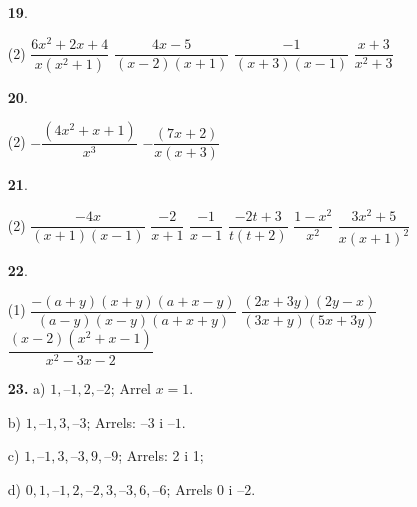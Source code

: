 \documentclass[a4paper, pdf, twoside]{book}
\begin{document}
\begin{multicols}{2}
\begin{enumerate}

 \item[\fontfamily{phv}\selectfont\color{blue}\textbf{19}. ] 
 \begin{tasks}[column-sep=1em, item-indent=1.3333em](2)
	 \task $\dfrac {6x^2+2x+4}{x(x^2+1)}$
	 \task $\dfrac {4x-5}{(x-2)(x+1)}$
	 \task $\dfrac {-1}{(x+3)(x-1)}$
	 \task $\dfrac {x+3}{x^2+3}$
\end{tasks}
 \end{enumerate}
\begin{enumerate}
\vspace{0.25cm}



 \item[\fontfamily{phv}\selectfont\color{blue}\textbf{20}. ] 
 \begin{tasks}[column-sep=1em, item-indent=1.3333em](2)
	 \task $-\dfrac {(4x^2+x+1)}{x^3}$
	 \task $-\dfrac {(7x+2)}{x(x+3)}$
\end{tasks}
\vspace{0.25cm}



 \item[\fontfamily{phv}\selectfont\color{blue}\textbf{21}. ]  \scalebox{0.6}{\simbolclau } 
 \begin{tasks}[column-sep=1em, item-indent=1.3333em](2)
	 \task  $\dfrac {-4x}{(x+1)(x-1)} $
	 \task $\dfrac {-2}{x+1} $
	 \task $\dfrac {-1}{x-1} $
	 \task $\dfrac {-2t+3}{t(t+2)} $
	 \task $\dfrac {1-x^{2} }{x^{2} } $
	 \task $\dfrac {3x^{2} +5}{x(x+1)^{2} } $
\end{tasks}
\vspace{0.25cm}



 \item[\fontfamily{phv}\selectfont\color{blue}\textbf{22}. ] 
 \begin{tasks}[column-sep=1em, item-indent=1.3333em](1)
	 \task* $\dfrac {-(a+y)(x+y)(a+x-y)}{(a-y)(x-y)(a+x+y)}$
	 \task* $\dfrac {(2x+3y)(2y-x)}{(3x+y)(5x+3y)}$
	 \task* $\dfrac {(x-2)(x^2+x-1)}{x^2-3x-2}$
\end{tasks}
\vspace{0.25cm}
\item[\fontfamily{phv}\selectfont\color{blue}\textbf{23. }] 
a) $1, –1, 2, –2$; Arrel $x = 1$.\par b) $1, –1, 3, –3$; Arrels: $–3$ i $–1$. \par c) $1, –1, 3, –3, 9, –9$; Arrels: 2 i 1; \par d) $0, 1, –1, 2, –2, 3, –3, 6, –6$; Arrels 0 i $–2$.
 \end{enumerate}
\vspace{0.3cm}


\end{multicols}
\end{document}
